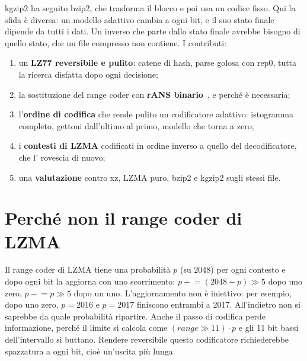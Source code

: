 kgzip2 ha seguito bzip2, che trasforma il blocco e poi usa un codice fisso. Qui la sfida è diversa: un modello adattivo cambia a ogni bit, e il suo stato finale dipende da tutti i dati. Un inverso che parte dallo stato finale avrebbe bisogno di quello stato, che un file compresso non contiene. I contributi:
\begin{enumerate}
\item un \textbf{LZ77 reversibile e pulito}: catene di hash, parse golosa con rep0, tutta la ricerca disfatta dopo ogni decisione;
\item la sostituzione del range coder con \textbf{rANS binario}~\cite{ans}, e perché è necessaria;
\item l'\textbf{ordine di codifica} che rende pulito un codificatore adattivo: istogramma completo, gettoni dall'ultimo al primo, modello che torna a zero;
\item i \textbf{contesti di LZMA} codificati in ordine inverso a quello del decodificatore, che l' rovescia di nuovo;
\item una \textbf{valutazione} contro xz, LZMA puro, bzip2 e kgzip2 sugli stessi file.
\end{enumerate}

\section{Perché non il range coder di LZMA}

Il range coder di LZMA tiene una probabilità $p$ (su 2048) per ogni contesto e dopo ogni bit la aggiorna con uno scorrimento: $p \mathrel{+}= (2048 - p) \gg 5$ dopo uno zero, $p \mathrel{-}= p \gg 5$ dopo un uno. L'aggiornamento non è iniettivo: per esempio, dopo uno zero, $p = 2016$ e $p = 2017$ finiscono entrambi a 2017. All'indietro non si saprebbe da quale probabilità ripartire. Anche il passo di codifica perde informazione, perché il limite si calcola come $(\mathit{range} \gg 11)\cdot p$ e gli 11 bit bassi dell'intervallo si buttano. Rendere reversibile questo codificatore richiederebbe spazzatura a ogni bit, cioè un'uscita più lunga.

